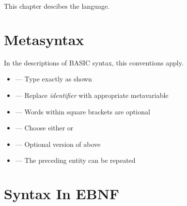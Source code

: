 This chapter descibes the \tbas{} language.

\section{Metasyntax}

In the descriptions of BASIC syntax, this conventions apply.
\\

\begin{itemize}
\item {} --- Type exactly as shown
\item {} --- Replace \emph{identifier} with appropriate metavariable
\item \code{[a]} --- Words within square brackets are optional
\item {} --- Choose either  or 
\item \code{[a|b]} --- Optional version of above
\item {} --- The preceding entity can be repeated
\end{itemize}


\section{Syntax In EBNF}

\small
